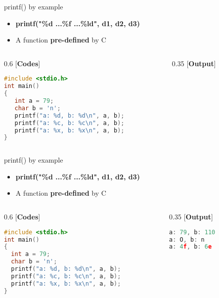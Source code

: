 \begin{frame}[fragile]{printf() by example}
	\begin{itemize}
		\item {\textbf{printf("\%d ...\%f ...\%ld", d1, d2, d3)}}
		\item {A function \textbf{pre-defined} by C}
	\end{itemize}
\begin{columns}	
\begin{column}{0.6\linewidth}
    [\textbf{Codes}]
	\begin{lstlisting}[numbers=none, language=c]
#include <stdio.h>
int main()
{
   int a = 79;
   char b = 'n';
   printf("a: %d, b: %d\n", a, b);
   printf("a: %c, b: %c\n", a, b);
   printf("a: %x, b: %x\n", a, b);
}
	\end{lstlisting}
\end{column}
\begin{column}{0.35\linewidth}
[\textbf{Output}]

\end{column}
\end{columns}
\end{frame}

\begin{frame}[fragile]{printf() by example}
	\begin{itemize}
		\item {\textbf{printf("\%d ...\%f ...\%ld", d1, d2, d3)}}
		\item {A function \textbf{pre-defined} by C}
	\end{itemize}
\begin{columns}	
\begin{column}{0.6\linewidth}
    [\textbf{Codes}]
	\begin{lstlisting}[numbers=none, language=c]
#include <stdio.h>
int main()
{
  int a = 79;
  char b = 'n';
  printf("a: %d, b: %d\n", a, b);
  printf("a: %c, b: %c\n", a, b);
  printf("a: %x, b: %x\n", a, b);
}
	\end{lstlisting}
\end{column}
\begin{column}{0.35\linewidth}
[\textbf{Output}]
\begin{lstlisting}[numbers=none, language=c]
a: 79, b: 110
a: O, b: n
a: 4f, b: 6e
\end{lstlisting}
\end{column}
\end{columns}
\end{frame}

